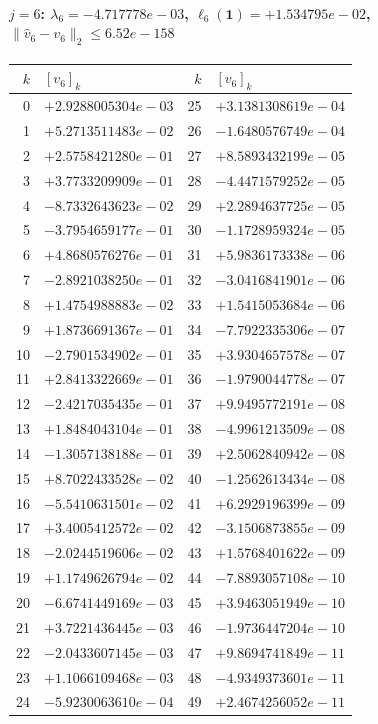 \documentclass[11pt]{article}
\begin{document}
\paragraph{$j = 6$: $\lambda_{6} = -4.717778e-03$, \quad $\ell_{6}(\mathbf{1}) = +1.534795e-02$, \quad $\|\hat{v}_{6} - v_{6}\|_2 \leq 6.52e-158$}
\begin{center}
{\footnotesize
\begin{tabular}{r@{\;\;}l@{\quad}r@{\;\;}l}
\toprule
$k$ & $[v_{6}]_k$ & $k$ & $[v_{6}]_k$ \\
\midrule
0 & $+2.9288005304e-03$ & 25 & $+3.1381308619e-04$ \\
1 & $+5.2713511483e-02$ & 26 & $-1.6480576749e-04$ \\
2 & $+2.5758421280e-01$ & 27 & $+8.5893432199e-05$ \\
3 & $+3.7733209909e-01$ & 28 & $-4.4471579252e-05$ \\
4 & $-8.7332643623e-02$ & 29 & $+2.2894637725e-05$ \\
5 & $-3.7954659177e-01$ & 30 & $-1.1728959324e-05$ \\
6 & $+4.8680576276e-01$ & 31 & $+5.9836173338e-06$ \\
7 & $-2.8921038250e-01$ & 32 & $-3.0416841901e-06$ \\
8 & $+1.4754988883e-02$ & 33 & $+1.5415053684e-06$ \\
9 & $+1.8736691367e-01$ & 34 & $-7.7922335306e-07$ \\
10 & $-2.7901534902e-01$ & 35 & $+3.9304657578e-07$ \\
11 & $+2.8413322669e-01$ & 36 & $-1.9790044778e-07$ \\
12 & $-2.4217035435e-01$ & 37 & $+9.9495772191e-08$ \\
13 & $+1.8484043104e-01$ & 38 & $-4.9961213509e-08$ \\
14 & $-1.3057138188e-01$ & 39 & $+2.5062840942e-08$ \\
15 & $+8.7022433528e-02$ & 40 & $-1.2562613434e-08$ \\
16 & $-5.5410631501e-02$ & 41 & $+6.2929196399e-09$ \\
17 & $+3.4005412572e-02$ & 42 & $-3.1506873855e-09$ \\
18 & $-2.0244519606e-02$ & 43 & $+1.5768401622e-09$ \\
19 & $+1.1749626794e-02$ & 44 & $-7.8893057108e-10$ \\
20 & $-6.6741449169e-03$ & 45 & $+3.9463051949e-10$ \\
21 & $+3.7221436445e-03$ & 46 & $-1.9736447204e-10$ \\
22 & $-2.0433607145e-03$ & 47 & $+9.8694741849e-11$ \\
23 & $+1.1066109468e-03$ & 48 & $-4.9349373601e-11$ \\
24 & $-5.9230063610e-04$ & 49 & $+2.4674256052e-11$ \\
\bottomrule
\end{tabular}
}
\end{center}
\end{document}
